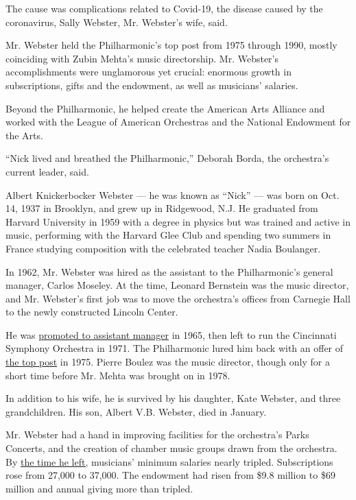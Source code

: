 The cause was complications related to Covid-19, the disease caused by
the coronavirus, Sally Webster, Mr. Webster's wife, said.

Mr. Webster held the Philharmonic's top post from 1975 through 1990,
mostly coinciding with Zubin Mehta's music directorship. Mr. Webster's
accomplishments were unglamorous yet crucial: enormous growth in
subscriptions, gifts and the endowment, as well as musicians' salaries.

Beyond the Philharmonic, he helped create the American Arts Alliance and
worked with the League of American Orchestras and the National Endowment
for the Arts.

``Nick lived and breathed the Philharmonic,'' Deborah Borda, the
orchestra's current leader, said.

Albert Knickerbocker Webster --- he was known as ``Nick'' --- was born
on Oct. 14, 1937 in Brooklyn, and grew up in Ridgewood, N.J. He
graduated from Harvard University in 1959 with a degree in physics but
was trained and active in music, performing with the Harvard Glee Club
and spending two summers in France studying composition with the
celebrated teacher Nadia Boulanger.

In 1962, Mr. Webster was hired as the assistant to the Philharmonic's
general manager, Carlos Moseley. At the time, Leonard Bernstein was the
music director, and Mr. Webster's first job was to move the orchestra's
offices from Carnegie Hall to the newly constructed Lincoln Center.

He was
\href{https://timesmachine.nytimes3xbfgragh.onion/timesmachine/1965/12/01/95917009.pdf?pdf_redirect=true\&ip=0}{promoted
to assistant manager} in 1965, then left to run the Cincinnati Symphony
Orchestra in 1971. The Philharmonic lured him back with an offer of
\href{https://www.nytimes3xbfgragh.onion/1975/03/01/archives/webster-of-cincinnati-to-head-philharmonic.html}{the
top post} in 1975. Pierre Boulez was the music director, though only for
a short time before Mr. Mehta was brought on in 1978.

In addition to his wife, he is survived by his daughter, Kate Webster,
and three grandchildren. His son, Albert V.B. Webster, died in January.

Mr. Webster had a hand in improving facilities for the orchestra's Parks
Concerts, and the creation of chamber music groups drawn from the
orchestra. By
\href{https://www.nytimes3xbfgragh.onion/1990/10/06/arts/administrator-quits-philharmonic.html}{the
time he left,} musicians' minimum salaries nearly tripled. Subscriptions
rose from 27,000 to 37,000. The endowment had risen from \$9.8 million
to \$69 million and annual giving more than tripled.

